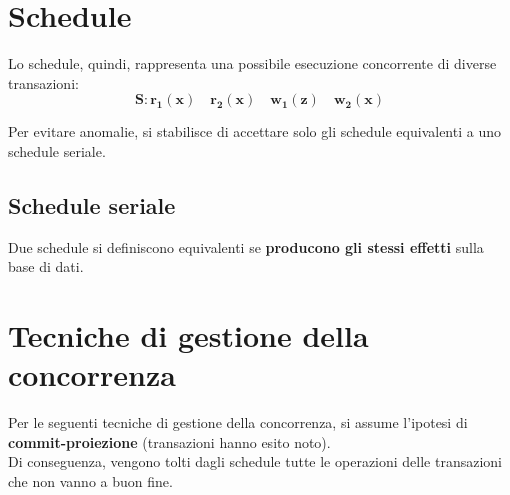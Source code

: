 \section{Schedule}

Lo schedule, quindi, rappresenta una possibile esecuzione concorrente di diverse transazioni:
\begin{equation*}
    \mathbf{S: r_1(x) \quad r_2(x) \quad w_1(z) \quad w_2(x)}
\end{equation*}

Per evitare anomalie, si stabilisce di accettare solo gli schedule equivalenti a uno schedule seriale.

\subsection{Schedule seriale}


Due schedule si definiscono equivalenti se \textbf{producono gli stessi effetti} sulla base di dati.

\section{Tecniche di gestione della concorrenza}
Per le seguenti tecniche di gestione della concorrenza, si assume l'ipotesi di \textbf{commit-proiezione} (transazioni hanno esito noto).\\[0.2ex]
Di conseguenza, vengono tolti dagli schedule tutte le operazioni delle transazioni che non vanno a buon fine.


